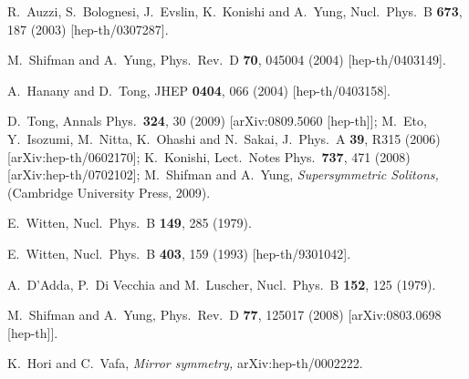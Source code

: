 \documentclass[epsfig,12pt]{article}
\begin{document}
\small
\begin{thebibliography}{99}
\itemsep -2pt

R.~Auzzi, S.~Bolognesi, J.~Evslin, K.~Konishi and A.~Yung,
Nucl.\ Phys.\ B {\bf 673}, 187 (2003)
[hep-th/0307287].

M.~Shifman and A.~Yung,
Phys.\ Rev.\ D {\bf 70}, 045004 (2004)
[hep-th/0403149].

A.~Hanany and D.~Tong,
JHEP {\bf 0404}, 066 (2004)
[hep-th/0403158].

D.~Tong,
  Annals Phys.\  {\bf 324}, 30 (2009)
  [arXiv:0809.5060 [hep-th]];
  M.~Eto, Y.~Isozumi, M.~Nitta, K.~Ohashi and N.~Sakai,
  J.\ Phys.\ A  {\bf 39}, R315 (2006)
  [arXiv:hep-th/0602170];
  K.~Konishi,
  Lect.\ Notes Phys.\  {\bf 737}, 471 (2008)
  [arXiv:hep-th/0702102];
M.~Shifman and A.~Yung,
{\sl Supersymmetric Solitons,}
(Cambridge University Press, 2009).

E.~Witten,
Nucl.\ Phys.\ B {\bf 149}, 285 (1979).

E.~Witten,
  Nucl.\ Phys.\ B {\bf 403}, 159 (1993)
  [hep-th/9301042].
  
  A.~D'Adda, P.~Di Vecchia and M.~Luscher,
  Nucl.\ Phys.\  B {\bf 152}, 125 (1979).
  
  M.~Shifman and A.~Yung,
  Phys.\ Rev.\  D {\bf 77}, 125017 (2008)
  [arXiv:0803.0698 [hep-th]].
  
  K.~Hori and C.~Vafa,
{\em Mirror symmetry,}
  arXiv:hep-th/0002222.
  

\end{thebibliography}
\end{document}
